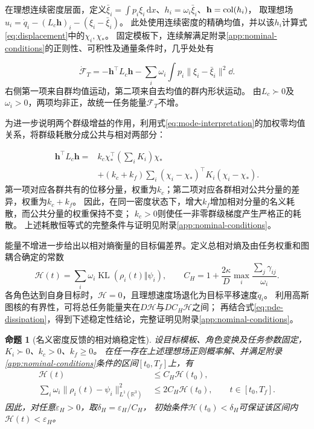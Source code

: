 \documentclass[UTF8,a4paper,11pt,fontset=none]{ctexart}
\newcommand{\R}{\mathbb R}\newcommand{\KL}{\operatorname{KL}}
\newtheorem{proposition}{命题}\newtheorem{lemma}{引理}
\begin{document}
在理想连续密度层面，定义$\bar\xi_i=\int p_i\xi_i\,\mathrm dx$、$h_i=\omega_i\bar\xi_i$、$\mathbf h=\operatorname{col}(h_i)$，
取理想场$u_i=\dot q_i-(L_c\mathbf h)_i-(\xi_i-\bar\xi_i)$。
此处使用连续密度的精确均值，并以该$h_i$计算式\eqref{eq:displacement}中的$\chi_i,\chi_*$。
固定模板下，连续解满足附录\ref{app:nominal-conditions}的正则性、可积性及通量条件时，几乎处处有

\begin{equation}
\dot{\mathcal F}_T=-\mathbf h^\top L_c\mathbf h
-\sum_i\omega_i\int p_i\|\xi_i-\bar\xi_i\|^2\dd .
\label{eq:pde-dissipation}
\end{equation}
右侧第一项来自群均值运动，第二项来自去均值的群内形状运动。
由$L_c\succ0$及$\omega_i>0$，两项均非正，故统一任务能量$\mathcal F_T$不增。

为进一步说明两个群级增益的作用，利用式\eqref{eq:mode-interpretation}的加权零均值关系，将群级耗散分成公共与相对两部分：

\begin{equation}
\begin{aligned}
\mathbf h^\top L_c\mathbf h
={}&k_c\chi_*^\top\left(\sum_iK_i\right)\chi_*\\
&+(k_c+k_f)\sum_i(\chi_i-\chi_*)^\top K_i(\chi_i-\chi_*).
\end{aligned}
\label{eq:positive-mean}
\end{equation}
第一项对应各群共有的位移分量，权重为$k_c$；第二项对应各群相对公共分量的差异，权重为$k_c+k_f$。
因此，在同一密度状态下，增大$k_f$增加相对分量的名义耗散，而公共分量的权重保持不变；
$k_c>0$则使任一非零群级梯度产生严格正的耗散。
上述耗散恒等式的完整条件与证明见附录\ref{app:nominal-conditions}。

能量不增进一步给出以相对熵衡量的目标偏差界。定义总相对熵及由任务权重和图耦合确定的常数
\[
\mathcal H(t)=\sum_i\omega_i\KL(\rho_i(t)\Vert\psi_i),\qquad
C_H=1+\frac{2\kappa}{D}\max_i\frac{\sum_j\gamma_{ij}}{\omega_i}.
\]
各角色达到自身目标时，$\mathcal H=0$，且理想速度场退化为目标平移速度$\dot q_i$。
利用高斯图核的有界性，可将总任务能量夹在$D\mathcal H$与$DC_H\mathcal H$之间；
再结合式\eqref{eq:pde-dissipation}，得到下述稳定性结论，完整证明见附录\ref{app:nominal-conditions}。

\begin{proposition}[名义密度反馈的相对熵稳定性]\label{prop:entropy-stability}
设目标模板、角色变换及任务参数固定，$K_i\succ0$、$k_c>0$、$k_f\ge0$。
在任一存在上述理想场正则概率解、并满足附录\ref{app:nominal-conditions}条件的区间$[t_0,T_f]$上，有
\begin{equation}
\begin{aligned}
\mathcal H(t)&\le C_H\mathcal H(t_0),\\
\sum_i\omega_i\|\rho_i(t)-\psi_i\|_{L^1(\R^3)}^2
&\le 2C_H\mathcal H(t_0),\qquad t\in[t_0,T_f].
\end{aligned}
\label{eq:entropy-stability}
\end{equation}
因此，对任意$\varepsilon_H>0$，取$\delta_H=\varepsilon_H/C_H$，
初始条件$\mathcal H(t_0)<\delta_H$可保证该区间内$\mathcal H(t)<\varepsilon_H$。
\end{proposition}
\end{document}
